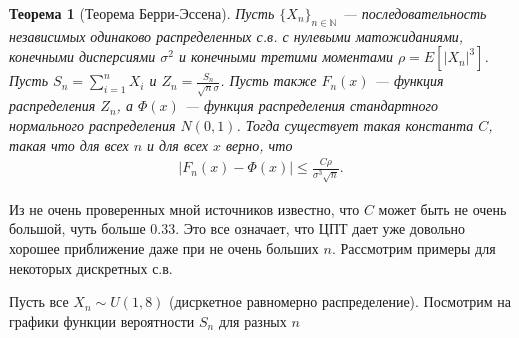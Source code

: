 \documentclass[12pt]{article}
\newcommand\N{\mathbb{N}}
\newtheorem{theorem}{Теорема}
\begin{document}
\begin{theorem}[Теорема Берри-Эссена]
  Пусть $\{X_n\}_{n \in \N}$ --- последовательность независимых одинаково распределенных с.в. с нулевыми матожиданиями, конечными дисперсиями $\sigma^2$ и конечными третими моментами $\rho = E[|X_n|^3]$. Пусть $S_n = \sum_{i = 1}^n X_i$ и $Z_n = \frac{S_n}{\sqrt{n} \sigma}$. Пусть также $F_n(x)$ --- функция распределения $Z_n$, а $\Phi(x)$ --- функция распределения стандартного нормального распределения $N(0, 1)$. Тогда существует такая константа $C$, такая что для всех $n$ и для всех $x$ верно, что
  \begin{align*}
    |F_n(x) - \Phi(x)| \le \frac{C\rho}{\sigma^3 \sqrt{n}}.
  \end{align*}
\end{theorem}

Из не очень проверенных мной источников известно, что $C$ может быть не очень большой, чуть больше $0.33$. Это все означает, что ЦПТ дает уже довольно хорошее приближение даже при не очень больших $n$. Рассмотрим примеры для некоторых дискретных с.в.

Пусть все $X_n \sim U(1, 8)$ (дисркетное равномерно распределение). Посмотрим на графики функции вероятности $S_n$ для разных $n$

\begin{center}
\end{center}

\begin{center}
\end{center}
\end{document}
